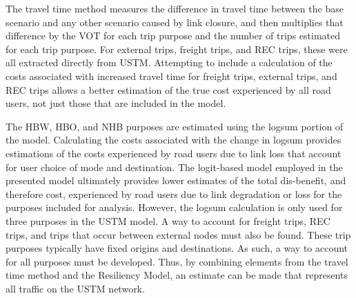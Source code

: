 The travel time method measures the difference in travel time between the base
scenario and any other scenario caused by link closure, and then multiplies that
difference by the VOT for each trip purpose and the number of trips estimated for
each trip purpose. For external trips, freight trips, and REC trips, these were all
extracted directly from USTM. Attempting to include a calculation of the costs
associated with increased travel time for freight trips, external trips, and REC
trips allows a better estimation of the true cost experienced by all road users, not
just those that are included in the model.

The HBW, HBO, and NHB purposes are estimated using the logsum portion of the
model. Calculating the costs associated with the change in logsum
provides estimations of the costs experienced by road users due to link loss
that account for user choice of mode and destination. The logit-based model
employed in the presented model ultimately provides lower estimates of the
total dis-benefit, and therefore cost, experienced by road users due to link
degradation or loss for the purposes included for analysis. However, the
logsum calculation is only used for three purposes in the USTM model. A way to
account for freight trips, REC trips, and trips that occur between external
nodes must also be found. These trip purposes typically have fixed origins
and destinations. As such, a way to account for all purposes must be developed.
Thus, by combining elements from the travel time method and the Resiliency
Model, an estimate can be made that represents all traffic on the USTM network.

